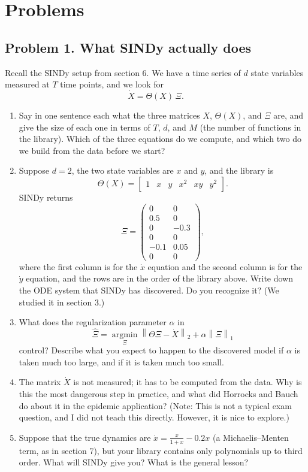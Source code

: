 \documentclass[a4paper,12pt]{article}
\begin{document}
\newpage

\section*{Problems}

\subsection*{Problem 1. What SINDy actually does}

Recall the SINDy setup from section 6. We have a time series of $d$ state variables measured at $T$ time points, and we look for
\[ \dot{X} = \Theta(X)\, \Xi . \]

\begin{enumerate}[label=(\alph*)]
\item Say in one sentence each what the three matrices $X$, $\Theta(X)$, and $\Xi$ are, and give the size of each one in terms of $T$, $d$, and $M$ (the number of functions in the library). Which of the three equations do we compute, and which two do we build from the data before we start?

\item Suppose $d=2$, the two state variables are $x$ and $y$, and the library is
\[ \Theta(X) = \begin{bmatrix} 1 & x & y & x^2 & xy & y^2 \end{bmatrix} . \]
SINDy returns
\[
\Xi =
\begin{pmatrix}
0 & 0\\
0.5 & 0\\
0 & -0.3\\
0 & 0\\
-0.1 & 0.05\\
0 & 0
\end{pmatrix},
\]
where the first column is for the $\dot x$ equation and the second column is for the $\dot y$ equation, and the rows are in the order of the library above. Write down the ODE system that SINDy has discovered. Do you recognize it? (We studied it in section 3.)

\item What does the regularization parameter $\alpha$ in
\[ \hat{\Xi} = \underset{\Xi}{\operatorname{argmin}} \left\| \Theta \Xi - \dot{X} \right\|_2 + \alpha \left\| \Xi \right\|_1 \]
control? Describe what you expect to happen to the discovered model if $\alpha$ is taken much too large, and if it is taken much too small.

\item The matrix $\dot X$ is not measured; it has to be computed from the data. Why is this the most dangerous step in practice, and what did Horrocks and Bauch do about it in the epidemic application? (Note: This is not a typical exam question, and I did not teach this directly. However, it is nice to explore.)

\item Suppose that the true dynamics are $\dot x = \frac{x}{1+x} - 0.2x$ (a Michaelis--Menten term, as in section 7), but your library contains only polynomials up to third order. What will SINDy give you? What is the general lesson?
\end{enumerate}
\end{document}
